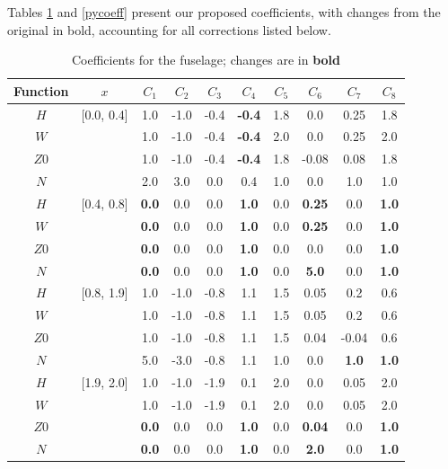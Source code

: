 \documentclass[journal]{new-aiaa}
\begin{document}
Tables \ref{fuscoeff} and \ref{pycoeff} present our proposed coefficients, with changes from the original \cite{nasa80051}
in bold, accounting for all corrections listed below.
\begin{table}[!h]
\caption{Coefficients for the fuselage; changes are in \textbf{bold}}
\centering
\begin{tabular}{cccccccccc}
Function & $x$ & $C_{1}$ & $C_{2}$ & $C_{3}$ & $C_{4}$ & $C_{5}$ & $C_{6}$ & $C_{7}$ & $C_{8}$ \\
\hline
$H$          & [0.0, 0.4]  & 1.0 & -1.0 & -0.4 & \textbf{-0.4} & 1.8 & 0.0    & 0.25 & 1.8 \\
$W$          &             & 1.0 & -1.0 & -0.4 & \textbf{-0.4} & 2.0 & 0.0    & 0.25 & 2.0 \\
$Z0$ &                & 1.0 & -1.0 & -0.4 & \textbf{-0.4} & 1.8 & -0.08 & 0.08 & 1.8 \\
$N$           &            & 2.0 & 3.0  & 0.0  &              0.4  & 1.0 & 0.0    & 1.0   & 1.0 \\
\hline
$H$          & [0.4, 0.8]  & \textbf{0.0} & 0.0 & 0.0 & \textbf{1.0} & 0.0 & \textbf{0.25} & 0.0 & \textbf{1.0} \\
$W$          &             & \textbf{0.0} & 0.0 & 0.0 & \textbf{1.0} & 0.0 & \textbf{0.25} & 0.0 & \textbf{1.0} \\
$Z0$ &                & \textbf{0.0} & 0.0 & 0.0 & \textbf{1.0} & 0.0 & 0.0               & 0.0 & \textbf{1.0} \\
$N$           &            & \textbf{0.0} & 0.0 & 0.0 & \textbf{1.0} & 0.0 & \textbf{5.0}   & 0.0 & \textbf{1.0} \\
\hline
$H$          & [0.8, 1.9]  & 1.0 & -1.0 & -0.8 & 1.1 & 1.5 & 0.05 & 0.2 & 0.6 \\
$W$          &             & 1.0 & -1.0 & -0.8 & 1.1 & 1.5 & 0.05 & 0.2 & 0.6 \\
$Z0$ &                & 1.0 & -1.0 & -0.8 & 1.1 & 1.5 & 0.04 & -0.04 & 0.6 \\
$N$           &            & 5.0 & -3.0 & -0.8 & 1.1 & 1.0 & 0.0 & \textbf{1.0} & \textbf{1.0} \\
\hline
$H$          & [1.9, 2.0]  & 1.0 & -1.0 & -1.9 & 0.1 & 2.0 & 0.0 & 0.05 & 2.0 \\
$W$          &             & 1.0 & -1.0 & -1.9 & 0.1 & 2.0 & 0.0 & 0.05 & 2.0 \\
$Z0$ &                & \textbf{0.0} & 0.0 & 0.0 & \textbf{1.0} & 0.0 & \textbf{0.04} & 0.0 & \textbf{1.0} \\
$N$           &            & \textbf{0.0} & 0.0 & 0.0 & \textbf{1.0} & 0.0 & \textbf{2.0} & 0.0 & \textbf{1.0} \\
\end{tabular}
\label{fuscoeff}
\end{table}
\end{document}
